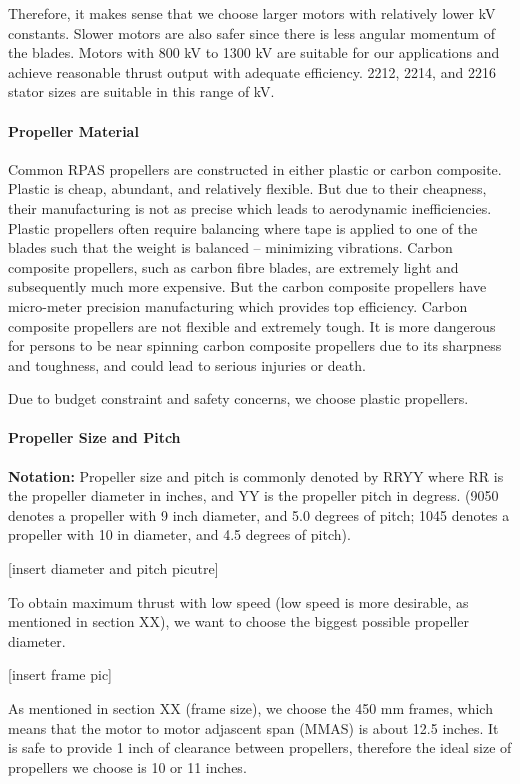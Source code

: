 Therefore, it makes sense that we choose larger motors with relatively lower kV constants. Slower motors 
are also safer since there is less angular momentum of the blades. Motors with 800 kV to 1300 kV are 
suitable for our applications and achieve reasonable thrust output with adequate efficiency. 2212, 2214, 
and 2216 stator sizes are suitable in this range of kV.

\paragraph{Propeller Material}

Common RPAS propellers are constructed in either plastic or carbon composite. Plastic is cheap, abundant, 
and relatively flexible. But due to their cheapness, their manufacturing is not as precise which leads to 
aerodynamic inefficiencies. Plastic propellers often require balancing where tape is applied to one of the 
blades such that the weight is balanced – minimizing vibrations. Carbon composite propellers, such as 
carbon fibre blades, are extremely light and subsequently much more expensive. But the carbon composite 
propellers have micro-meter precision manufacturing which provides top efficiency. Carbon composite 
propellers are not flexible and extremely tough. It is more dangerous for persons to be near spinning 
carbon composite propellers due to its sharpness and toughness, and could lead to serious injuries or death.

Due to budget constraint and safety concerns, we choose plastic propellers.

\paragraph{Propeller Size and Pitch}

\textbf{Notation: } Propeller size and pitch is commonly denoted by RRYY where RR is the propeller diameter in inches, and YY is the propeller pitch in degress. (9050 denotes a propeller with 9 inch diameter, and 5.0 degrees of pitch; 1045 denotes a propeller with 10 in diameter, and 4.5 degrees of pitch).

[insert diameter and pitch picutre]

To obtain maximum thrust with low speed (low speed is more desirable, as mentioned in section XX), we want to choose the biggest possible propeller diameter.

[insert frame pic]

As mentioned in section XX (frame size), we choose the 450 mm frames, which means that the motor to motor 
adjascent span (MMAS) is about 12.5 inches. It is safe to provide 1 inch of clearance between propellers, 
therefore the ideal size of propellers we choose is 10 or 11 inches.


